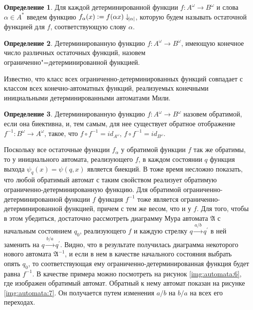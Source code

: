 \documentclass[och, master]{SCWorks}
\theoremstyle{plain}
\theoremstyle{plain}
\theoremstyle{plain}
\theoremstyle{definition}
\newtheorem{defn}{Определение}
\begin{document}
\begin{defn}
Для каждой детерминированной функции $f: A^{\omega} \rightarrow B^{\omega}$ и слова  $\alpha \in A^{*}$ введем функцию $f_{\alpha}(x) :=f(\alpha x)\downarrow_{\abs{\alpha}}$, которую будем называть остаточной функцией для $f$, соответствующую слову $\alpha$.	
\end{defn}


\begin{defn}
Детерминированную функцию $f: A^{\omega} \rightarrow B^{\omega}$, имеющую конечное число различных остаточных функций, назовем ограниченно"=детерминированной функцией.
\end{defn}


Известно\cite{bib:automata:aleshin}, что класс всех ограниченно-детерминированных функций совпадает с классом всех конечно-автоматных функций, реализуемых конечными инициальными детерминированными автоматами Мили. 


\begin{defn}
Детерминированную функцию $f: A^{\omega} \rightarrow B^{\omega}$ назовем обратимой, если она биективна, и, тем самым, для нее существует обратное отображение $f^{-1}: B^{\omega} \rightarrow A^{\omega}$, такое, что $f \circ f^{-1} = id_{A^\omega}$, $f \circ f^{-1}= id_{B^\omega}$. 
\end{defn}


Поскольку все остаточные функции $f_{\alpha}$ у обратимой функции $f$ так же обратимы, то у инициального автомата, реализующего $f$, в каждом состоянии $q$ функция выхода $\psi_q (x)=\psi(q,x)$ является биекций. В тоже время несложно показать, что любой обратимый автомат с таким свойством реализует обратимую ограниченно-детерминированную функцию. Для обратимой ограниченно-детерминированной функции $f$ функция $f^{-1}$ тоже является ограниченно-детерминированной функцией, причем с тем же весом, что и у $f$. Для того, чтобы в этом убедиться, достаточно рассмотреть диаграмму Мура автомата $\mathfrak{A}$ с начальным состоянием $q_0$, реализующего $f$ и каждую стрелку $q \xrightarrow{a/b} q^{'}$ в ней заменить на $q \xrightarrow{b/a} q^{'}$. Видно, что в результате получилась диаграмма некоторого нового автомата $\mathfrak{A}^{-1}$, и если в нем в качестве начального состояния выбрать опять $q_0$, то соответствующая ему ограниченно-детерминированная функция будет равна $f^{-1}$. В качестве примера можно посмотреть на рисунок \ref{img:automata:6}, где изображен обратимый автомат. Обратный к нему автомат показан на рисунке \ref{img:automata:7}. Он получается путем изменения $a/b$ на $b/a$ на всех его переходах.
\end{document}
